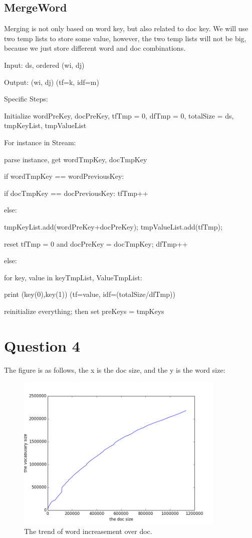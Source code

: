 \documentclass{article} %
\begin{document}
\subsection{MergeWord}
Merging is not only based on word key, but also related to doc key. We will
use two temp lists to store some value, however, the two temp lists will not
be big, because we just store different word and doc combinations.

Input: ds, ordered (wi, dj)

Output: (wi, dj) \quad (tf=k, idf=m)

Specific Steps:

Initialize wordPreKey, docPreKey, tfTmp = 0,
dfTmp = 0, totalSize = ds, tmpKeyList, tmpValueList

For instance in Stream:

\qquad parse instance, get wordTmpKey, docTmpKey

\qquad \qquad if wordTmpKey == wordPreviousKey:

\qquad \qquad \qquad if docTmpKey == docPreviousKey: tfTmp++

\qquad \qquad \qquad else:

\qquad \qquad \qquad \qquad tmpKeyList.add(wordPreKey+docPreKey); tmpValueList.add(tfTmp);

\qquad \qquad \qquad \qquad reset tfTmp = 0 and docPreKey = docTmpKey; dfTmp++

\qquad \qquad else:

\qquad \qquad \qquad for key, value in keyTmpList, ValueTmpList:

\qquad \qquad \qquad \qquad print \quad (key(0),key(1)) \quad (tf=value,
idf=(totalSize/dfTmp))

\qquad \qquad \qquad reinitialize everything; then set preKeys = tmpKeys

\section{Question 4}
The figure is as follows, the x is the doc size, and the y is the word size:

\begin{figure}[h]
\begin{center}
\includegraphics[width=100mm]{pic/doc_word.png}
\end{center}
\caption{The trend of word increasement over doc.}
\label{fig:doc_word}
\end{figure}
\end{document}
